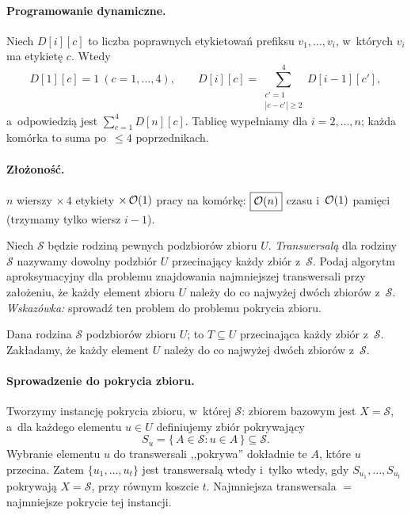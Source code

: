 \paragraph{Programowanie dynamiczne.}
Niech $D[i][c]$ to liczba poprawnych etykietowań prefiksu $v_1,\dots,v_i$,
w~których $v_i$ ma etykietę $c$. Wtedy
\[
	D[1][c]=1\ (c=1,\dots,4),\qquad
	D[i][c]=\!\!\sum_{\substack{c'=1\\|c-c'|\geq 2}}^{4}\!\! D[i-1][c'],
\]
a~odpowiedzią jest $\sum_{c=1}^{4} D[n][c]$. Tablicę wypełniamy dla
$i=2,\dots,n$; każda komórka to suma po~$\leq 4$ poprzednikach.

\paragraph{Złożoność.}
$n$ wierszy $\times\,4$ etykiety $\times\,\mathcal{O}(1)$ pracy na komórkę:
$\boxed{\mathcal{O}(n)}$ czasu i~$\mathcal{O}(1)$ pamięci (trzymamy tylko wiersz $i-1$).

\clearpage
\begin{zadanie}
	Niech $\mathcal{S}$ będzie rodziną pewnych podzbiorów zbioru $U$.
	\emph{Transwersalą} dla rodziny $\mathcal{S}$ nazywamy dowolny podzbiór $U$
	przecinający każdy zbiór z~$\mathcal{S}$. Podaj algorytm aproksymacyjny dla
	problemu znajdowania najmniejszej transwersali przy założeniu, że każdy
	element zbioru $U$ należy do co najwyżej dwóch zbiorów z~$\mathcal{S}$.
	\emph{Wskazówka:} sprowadź ten problem do problemu pokrycia zbioru.
\end{zadanie}

Dana rodzina $\mathcal{S}$ podzbiorów zbioru $U$;  to
$T\subseteq U$ przecinająca każdy zbiór z~$\mathcal{S}$. Zakładamy, że każdy
element $U$ należy do co najwyżej dwóch zbiorów z~$\mathcal{S}$.

\paragraph{Sprowadzenie do pokrycia zbioru.}
Tworzymy instancję pokrycia zbioru, w~której 
$\mathcal{S}$: zbiorem bazowym jest $X=\mathcal{S}$, a~dla każdego elementu
$u\in U$ definiujemy zbiór pokrywający
\[
	S_u=\{\,A\in\mathcal{S} : u\in A\,\}\subseteq\mathcal{S}.
\]
Wybranie elementu $u$ do transwersali ,,pokrywa'' dokładnie te $A$, które $u$
przecina. Zatem $\{u_1,\dots,u_t\}$ jest transwersalą wtedy i~tylko wtedy, gdy
$S_{u_1},\dots,S_{u_t}$ pokrywają $X=\mathcal{S}$, przy równym koszcie $t$.
Najmniejsza transwersala $=$ najmniejsze pokrycie tej instancji.

